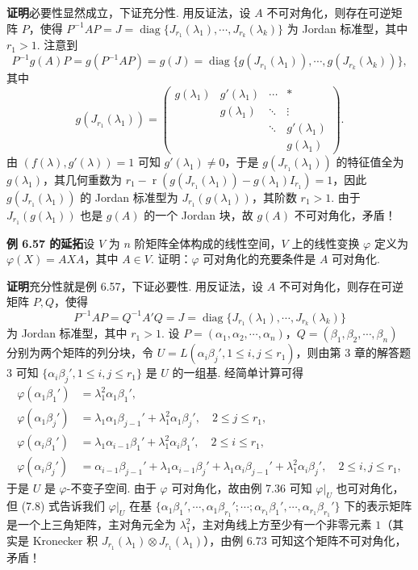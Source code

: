 \documentclass[UTF8,12pt,a4paper,fontset=fandol]{ctexart}
\begin{document}
\noindent\textbf{证明}\quad 必要性显然成立，下证充分性. 用反证法，设 $A$ 不可对角化，则存在可逆矩阵 $P$，使得 $P^{-1}AP=J=\operatorname{diag}\{J_{r_1}(\lambda_1),\cdots,J_{r_k}(\lambda_k)\}$ 为 Jordan 标准型，其中 $r_1>1$. 注意到
\[
P^{-1}g(A)P=g(P^{-1}AP)=g(J)=\operatorname{diag}\{g(J_{r_1}(\lambda_1)),\cdots,g(J_{r_k}(\lambda_k))\},
\]
其中
\[
g(J_{r_1}(\lambda_1))=
\left(\begin{array}{ccccc}
g(\lambda_1) & g'(\lambda_1) & \cdots & *\\
             & g(\lambda_1)  & \ddots & \vdots\\
             &               & \ddots & g'(\lambda_1)\\
             &               &        & g(\lambda_1)
\end{array}\right).
\]
由 $(f(\lambda),g'(\lambda))=1$ 可知 $g'(\lambda_1)\ne 0$，于是 $g(J_{r_1}(\lambda_1))$ 的特征值全为 $g(\lambda_1)$，其几何重数为 $r_1-\operatorname{r}(g(J_{r_1}(\lambda_1))-g(\lambda_1)I_{r_1})=1$，因此 $g(J_{r_1}(\lambda_1))$ 的 Jordan 标准型为 $J_{r_1}(g(\lambda_1))$，其阶数 $r_1>1$. 由于 $J_{r_1}(g(\lambda_1))$ 也是 $g(A)$ 的一个 Jordan 块，故 $g(A)$ 不可对角化，矛盾！

\noindent\textbf{例 6.57 的延拓}\quad 设 $V$ 为 $n$ 阶矩阵全体构成的线性空间，$V$ 上的线性变换 $\varphi$ 定义为 $\varphi(X)=AXA$，其中 $A\in V$. 证明：$\varphi$ 可对角化的充要条件是 $A$ 可对角化.

\noindent\textbf{证明}\quad 充分性就是例 6.57，下证必要性. 用反证法，设 $A$ 不可对角化，则存在可逆矩阵 $P,Q$，使得
\[
P^{-1}AP=Q^{-1}A'Q=J=\operatorname{diag}\{J_{r_1}(\lambda_1),\cdots,J_{r_k}(\lambda_k)\}
\]
为 Jordan 标准型，其中 $r_1>1$. 设 $P=(\alpha_1,\alpha_2,\cdots,\alpha_n)$，$Q=(\beta_1,\beta_2,\cdots,\beta_n)$ 分别为两个矩阵的列分块，令 $U=L(\alpha_i\beta_j',1\le i,j\le r_1)$，则由第 3 章的解答题 3 可知 $\{\alpha_i\beta_j',1\le i,j\le r_1\}$ 是 $U$ 的一组基. 经简单计算可得
\begin{equation}
\begin{array}{rl}
\varphi(\alpha_1\beta_1')&=\lambda_1^2\alpha_1\beta_1',\\
\varphi(\alpha_1\beta_j')&=\lambda_1\alpha_1\beta_{j-1}'+\lambda_1^2\alpha_1\beta_j',\quad 2\le j\le r_1,\\
\varphi(\alpha_i\beta_1')&=\lambda_1\alpha_{i-1}\beta_1'+\lambda_1^2\alpha_i\beta_1',\quad 2\le i\le r_1,\\
\varphi(\alpha_i\beta_j')&=\alpha_{i-1}\beta_{j-1}'+\lambda_1\alpha_{i-1}\beta_j'
+\lambda_1\alpha_i\beta_{j-1}'+\lambda_1^2\alpha_i\beta_j',\quad 2\le i,j\le r_1,
\end{array}
\tag{7.8}
\end{equation}
于是 $U$ 是 $\varphi$-不变子空间. 由于 $\varphi$ 可对角化，故由例 7.36 可知 $\varphi|_U$ 也可对角化，但 (7.8) 式告诉我们 $\varphi|_U$ 在基 $\{\alpha_1\beta_1',\cdots,\alpha_1\beta_{r_1}';\cdots;\alpha_{r_1}\beta_1',\cdots,\alpha_{r_1}\beta_{r_1}'\}$ 下的表示矩阵是一个上三角矩阵，主对角元全为 $\lambda_1^2$，主对角线上方至少有一个非零元素 $1$（其实是 Kronecker 积 $J_{r_1}(\lambda_1)\otimes J_{r_1}(\lambda_1)$），由例 6.73 可知这个矩阵不可对角化，矛盾！
\end{document}
